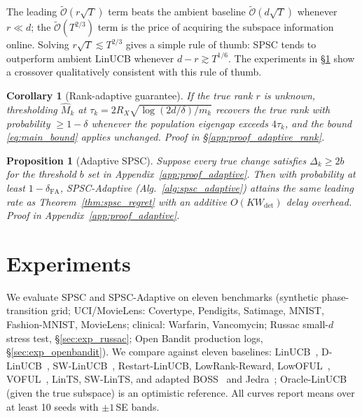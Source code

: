 \documentclass{article}
\newcommand{\tilO}{\widetilde{\mathcal{O}}}
\newtheorem{corollary}{Corollary}
\newtheorem{proposition}{Proposition}
\begin{document}
The leading $\tilO(r\sqrt{T})$ term beats the ambient baseline
$\tilO(d\sqrt{T})$ whenever $r \ll d$; the $\tilO(T^{2/3})$ term is
the price of acquiring the subspace information online. Solving
$r\sqrt{T}\lesssim T^{2/3}$ gives a simple rule of thumb: SPSC tends
to outperform ambient LinUCB whenever $d-r\gtrsim T^{1/6}$. The
experiments in \S\ref{sec:experiments} show a crossover
qualitatively consistent with this rule of thumb.

\begin{corollary}[Rank-adaptive guarantee]
\label{cor:rank_adaptive}
If the true rank $r$ is unknown, thresholding $\widehat M_k$
at $\tau_k = 2R_X\sqrt{\log(2d/\delta)/m_k}$ recovers the true rank
with probability $\ge 1-\delta$ whenever the population eigengap
exceeds $4\tau_k$, and the bound \eqref{eq:main_bound} applies
unchanged. Proof in \S\ref{app:proof_adaptive_rank}.
\end{corollary}

\begin{proposition}[Adaptive SPSC]
  \label{thm:spsc_adaptive}
  Suppose every true change satisfies $\Delta_k\ge 2b$ for the
  threshold $b$ set in Appendix~\ref{app:proof_adaptive}. Then with
  probability at least $1-\delta_{\mathrm{FA}}$, SPSC-Adaptive
  (Alg.~\ref{alg:spsc_adaptive}) attains the same leading rate as
  Theorem~\ref{thm:spsc_regret} with an additive $O(K W_{\mathrm{det}})$
  delay overhead. Proof in Appendix~\ref{app:proof_adaptive}.
  \end{proposition}


\section{Experiments}
\label{sec:experiments}

We evaluate SPSC and SPSC-Adaptive on eleven benchmarks (synthetic
phase-transition grid; UCI/MovieLens: Covertype, Pendigits, Satimage,
MNIST, Fashion-MNIST, MovieLens; clinical: Warfarin, Vancomycin;
Russac small-$d$ stress test, \S\ref{sec:exp_russac}; Open Bandit
production logs, \S\ref{sec:exp_openbandit}). We compare against
eleven baselines: LinUCB~\citep{abbasi2011improved},
D-LinUCB~\citep{russac2019weighted},
SW-LinUCB~\citep{cheung2019learning}, Restart-LinUCB, LowRank-Reward,
LowOFUL~\citep{jun2019bilinear}, VOFUL~\citep{kim2022improved}, LinTS,
SW-LinTS, and adapted BOSS~\citep{duong2024beyond} and
Jedra~\citep{jedra2024low}; Oracle-LinUCB (given the true
subspace) is an optimistic reference. All curves report means over
at least 10 seeds with $\pm 1$\,SE bands.
\end{document}
